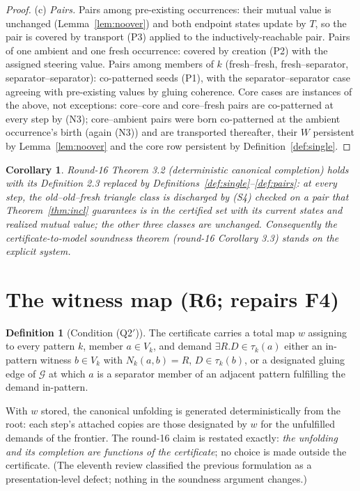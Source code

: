 \documentclass[11pt]{article}
\newtheorem{corollary}[theorem]{Corollary}
\theoremstyle{definition}
\newtheorem{definition}[theorem]{Definition}
\begin{document}
\begin{proof}
(c) \emph{Pairs.}  Pairs among pre-existing occurrences: their mutual
value is unchanged (Lemma~\ref{lem:noover}) and both endpoint states
update by $T$, so the pair is covered by transport (P3) applied to the
inductively-reachable pair.  Pairs of one ambient and one fresh
occurrence: covered by creation (P2) with the assigned steering value.
Pairs among members of $k$ (fresh--fresh, fresh--separator,
separator--separator): co-patterned seeds (P1), with the
separator--separator case agreeing with pre-existing values by gluing
coherence.  Core cases are instances of the above, not exceptions:
core--core and core--fresh pairs are co-patterned at every step by
(N3); core--ambient pairs were born co-patterned at the ambient
occurrence's birth (again (N3)) and are transported thereafter, their
$W$ persistent by Lemma~\ref{lem:noover} and the core row persistent by
Definition~\ref{def:single}.
\end{proof}

\begin{corollary}\label{cor:sound}
Round-16 Theorem 3.2 (deterministic canonical completion) holds with
its Definition 2.3 replaced by
Definitions~\ref{def:single}--\ref{def:pairs}: at every step, the
old--old--fresh triangle class is discharged by (S4) checked on a pair
that Theorem~\ref{thm:incl} guarantees is in the certified set with its
\emph{current} states and realized mutual value; the other three
classes are unchanged.  Consequently the certificate-to-model soundness
theorem (round-16 Corollary 3.3) stands on the explicit system.
\end{corollary}

\section{The witness map (R6; repairs F4)}\label{sec:witness}

\begin{definition}[Condition (Q2$'$)]
The certificate carries a total map $w$ assigning to every pattern $k$,
member $a\in V_k$, and demand $\exists R.D\in\tau_k(a)$ either an
in-pattern witness $b\in V_k$ with $N_k(a,b)=R$, $D\in\tau_k(b)$, or a
designated gluing edge of $\mathcal G$ at which $a$ is a separator
member of an adjacent pattern fulfilling the demand in-pattern.
\end{definition}

With $w$ stored, the canonical unfolding is generated deterministically
from the root: each step's attached copies are those designated by $w$
for the unfulfilled demands of the frontier.  The round-16 claim is
restated exactly: \emph{the unfolding and its completion are functions
of the certificate}; no choice is made outside the certificate.  (The
eleventh review classified the previous formulation as a
presentation-level defect; nothing in the soundness argument changes.)
\end{document}
